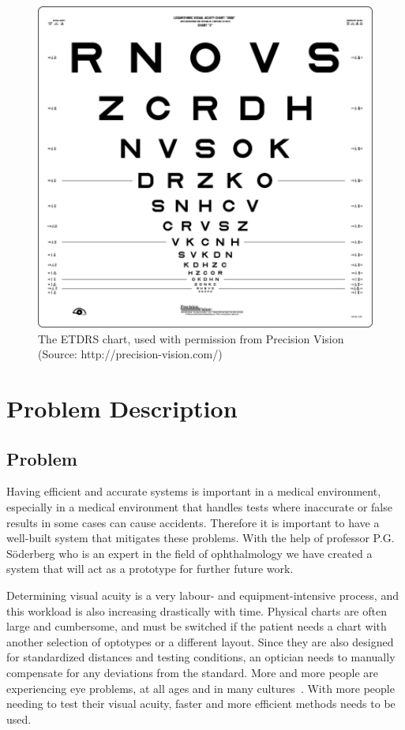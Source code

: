 \documentclass[12pt,a4paper,notitlepage]{report}
\begin{document}
\begin{figure}[ht!]
\centering
\includegraphics[width=120mm]{images/etdrs_chart.jpg}
\caption[The ETDRS chart]{The ETDRS chart, used with permission from Precision Vision \\ (Source: http://precision-vision.com/)\label{fig:etdrs_chart1}}
\end{figure} 

\chapter{ Problem Description}
\section{Problem}
Having efficient and accurate systems is important in a medical environment, especially in a medical environment that handles tests where inaccurate or false results in some cases can cause accidents. Therefore it is important to have a well-built system that mitigates these problems. With the help of professor P.G. Söderberg who is an expert in the field of ophthalmology we have created a system that will act as a prototype for further future work. 

Determining visual acuity is a very labour- and equipment-intensive process, and this workload is also increasing drastically with time. Physical charts are often large and cumbersome, and must be switched if the patient needs a chart with another selection of optotypes or a different layout. Since they are also designed for standardized distances and testing conditions, an optician needs to manually compensate for any deviations from the standard. More and more people are experiencing eye problems, at all ages and in many cultures~\cite{vision_loss}. With more people needing to test their visual acuity, faster and more efficient methods needs to be used.
\end{document}

